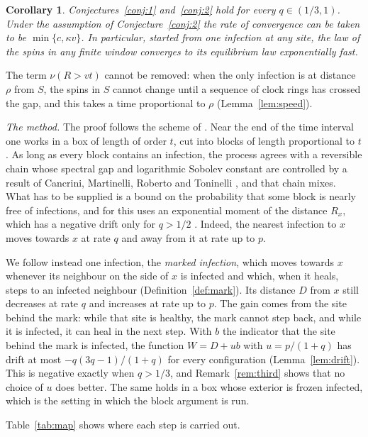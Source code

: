\documentclass[11pt]{amsart}
\newtheorem{corollary}[theorem]{Corollary}
\theoremstyle{definition}
\theoremstyle{remark}
\begin{document}
\begin{corollary}\label{cor:conj}
Conjectures~\ref{conj:1} and~\ref{conj:2} hold for every $q\in(1/3,1)$. Under the assumption of Conjecture~\ref{conj:2}
the rate of convergence can be taken to be $\min\{c,\kappa v\}$. In particular, started from one infection at any site,
the law of the spins in any finite window converges to its equilibrium law exponentially fast.
\end{corollary}

The term $\nu(R>vt)$ cannot be removed: when the only infection is at distance $\rho$ from $S$, the spins in $S$ cannot
change until a sequence of clock rings has crossed the gap, and this takes a time proportional to $\rho$
(Lemma~\ref{lem:speed}).

\emph{The method.} The proof follows the scheme of \cite[Section~3]{BCMRT13}. Near the end of the time interval one
works in a box of length of order $t$, cut into blocks of length proportional to $t$. As long as every block contains an
infection, the process agrees with a reversible chain whose spectral gap and logarithmic Sobolev constant are controlled by
a result of Cancrini, Martinelli, Roberto and Toninelli \cite[Proposition~3.4]{BCMRT13}, and that chain mixes. What has to be
supplied is a bound on the probability that some block is nearly free of infections, and for this \cite{BCMRT13} uses an
exponential moment of the distance $R_x$, which has a negative drift only for $q>1/2$ \cite[Proposition~4.1]{BCMRT13}.
Indeed, the nearest infection to $x$ moves towards $x$ at rate $q$ and away from it at rate up to $p$.

We follow instead one infection, the \emph{marked infection}, which moves towards $x$ whenever its neighbour on the side of
$x$ is infected and which, when it heals, steps to an infected neighbour (Definition~\ref{def:mark}). Its distance $D$
from $x$ still decreases at rate $q$ and increases at rate up to $p$. The gain comes from the site behind the mark: while that site is healthy, the mark
cannot step back, and while it is infected, it can heal in the next step. With $b$ the indicator that the site behind the mark
is infected, the function $W=D+ub$ with $u=p/(1+q)$ has drift at most $-q(3q-1)/(1+q)$ for every configuration
(Lemma~\ref{lem:drift}). This is negative exactly when $q>1/3$, and Remark~\ref{rem:third} shows that no choice of $u$ does
better. The same holds in a box whose exterior is frozen infected, which is the setting in which the block argument is run.

Table~\ref{tab:map} shows where each step is carried out.
\end{document}
